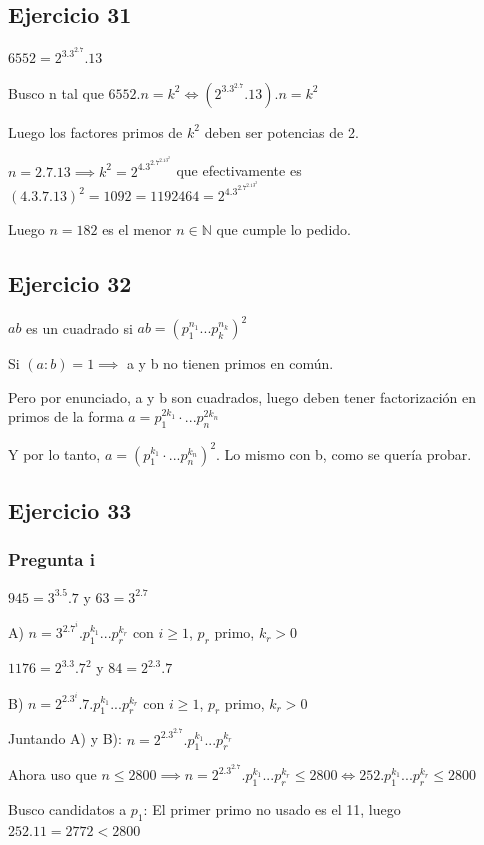 \subsection{Ejercicio 31}
$ 6552 = 2^3.3^2.7.13 $

Busco n tal que $ 6552 . n = k^2 \iff (2^3.3^2.7.13).n = k^2 $

Luego los factores primos de $ k^2 $ deben ser potencias de 2.

$ n = 2.7.13 \implies k^2 = 2^4.3^2.7^2.13^2 $ que efectivamente es $ (4.3.7.13)^2 = 1092 = 1192464 = 2^4.3^2.7^2.13^2 $

Luego $ n = 182 $ es el menor $ n \in \mathbb{N} $ que cumple lo pedido.

\subsection{Ejercicio 32}
$ab$ es un cuadrado si $ ab = (p_1^{n_1}...p_k^{n_k})^2 $

Si $ (a:b) = 1 \implies $ a y b no tienen primos en común.

Pero por enunciado, a y b son cuadrados, luego deben tener factorización en primos de la forma $ a = p_1^{2k_1} \cdot ... p_n^{2k_n} $

Y por lo tanto, $ a = (p_1^{k_1} \cdot ... p_n^{k_n})^2 $. Lo mismo con b, como se quería probar.

\subsection{Ejercicio 33}
\subsubsection{Pregunta i}

$ 945 = 3^3.5.7 $ y $ 63 = 3^2.7$

A) $ n = 3^2.7^i.p_1^{k_1}...p_r^{k_r} $ con $ i \geq 1 $, $ p_r $ primo, $ k_r > 0 $

$ 1176 = 2^3.3.7^2 $ y $ 84 = 2^2.3.7 $

B) $ n = 2^2.3^i.7.p_1^{k_1}...p_r^{k_r} $ con $ i \geq 1 $, $ p_r $ primo, $ k_r > 0 $

Juntando A) y B): $ n = 2^2.3^2.7.p_1^{k_1}...p_r^{k_r} $

Ahora uso que $ n \leq 2800 \implies n = 2^2.3^2.7.p_1^{k_1}...p_r^{k_r} \leq 2800 \iff 252.p_1^{k_1}...p_r^{k_r} \leq 2800 $

Busco candidatos a $ p_1 $: El primer primo no usado es el 11, luego $ 252.11 = 2772 < 2800 $

